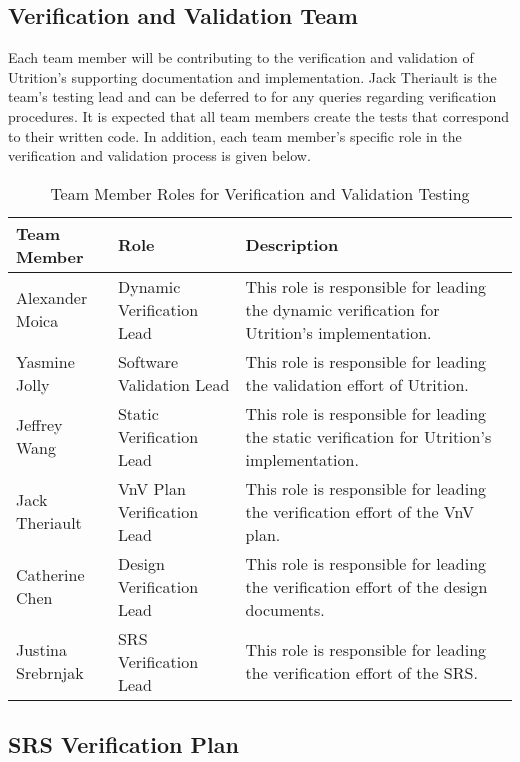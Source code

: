 \documentclass[12pt, titlepage]{article}
\begin{document}
	\subsection{Verification and Validation Team}
	
	
	Each team member will be contributing to the verification and validation of Utrition's supporting documentation and implementation. Jack Theriault is the team's testing lead and can be deferred to for any queries regarding verification procedures. It is expected that all team members create the tests that correspond to their written code. In addition, each team member's specific role in the verification and validation process is given below.
	
	\begin{table}[H]
		\centering
		\label{Table:Testing_Roles}
		\begin{tabular}{|p{3.2cm}|p{4cm}|p{5.5cm}|}
			\hline
			\textbf{Team Member} & \textbf{Role} & \textbf{Description}\\ \hline
			Alexander Moica& Dynamic Verification Lead& This role is responsible for leading the dynamic verification for Utrition's implementation.\\ \hline
			Yasmine Jolly& Software Validation Lead & This role is responsible for leading the validation effort of Utrition.\\ \hline
			Jeffrey Wang& Static Verification Lead & This role is responsible for leading the static verification for Utrition's implementation.\\ \hline
			Jack Theriault& VnV Plan Verification Lead& This role is responsible for leading the verification effort of the VnV plan.\\ \hline
			Catherine Chen& Design Verification Lead& This role is responsible for leading the verification effort of the design documents.\\ \hline
			Justina Srebrnjak& SRS Verification Lead& This role is responsible for leading the verification effort of the SRS. \\ \hline
		\end{tabular}
		\caption{Team Member Roles for Verification and Validation Testing}
	\end{table} 
	
	\subsection{SRS Verification Plan}
	
\end{document}
